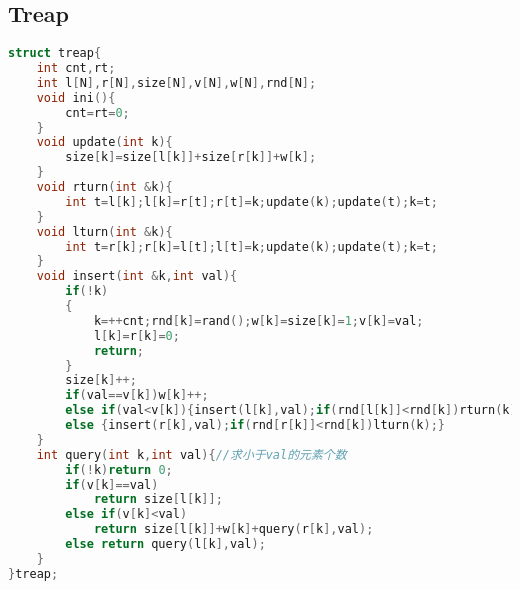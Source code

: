 \subsection{Treap}
\begin{lstlisting}[language=C]
struct treap{
	int cnt,rt;
	int l[N],r[N],size[N],v[N],w[N],rnd[N];
	void ini(){
		cnt=rt=0;
	}
	void update(int k){
		size[k]=size[l[k]]+size[r[k]]+w[k];
	}
	void rturn(int &k){
		int t=l[k];l[k]=r[t];r[t]=k;update(k);update(t);k=t;
	}
	void lturn(int &k){
		int t=r[k];r[k]=l[t];l[t]=k;update(k);update(t);k=t;
	}
	void insert(int &k,int val){
		if(!k)
		{
			k=++cnt;rnd[k]=rand();w[k]=size[k]=1;v[k]=val;
			l[k]=r[k]=0;
			return;
		}
		size[k]++;
		if(val==v[k])w[k]++;
		else if(val<v[k]){insert(l[k],val);if(rnd[l[k]]<rnd[k])rturn(k);}
		else {insert(r[k],val);if(rnd[r[k]]<rnd[k])lturn(k);}
	}
	int query(int k,int val){//求小于val的元素个数
		if(!k)return 0;
		if(v[k]==val)
			return size[l[k]];
		else if(v[k]<val)
			return size[l[k]]+w[k]+query(r[k],val);
		else return query(l[k],val);
	}
}treap;
\end{lstlisting}
